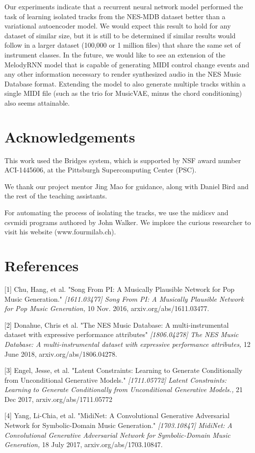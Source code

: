 \documentclass{article}
\begin{document}
Our experiments indicate that a recurrent neural network model performed the task of learning isolated tracks from the NES-MDB dataset better than a variational autoencoder model. We would expect this result to hold for any dataset of similar size, but it is still to be determined if similar results would follow in a larger dataset (100,000 or 1 million files) that share the same set of instrument classes. In the future, we would like to see an extension of the MelodyRNN model that is capable of generating MIDI control change events and any other information necessary to render synthesized audio in the NES Music Database format. Extending the model to also generate multiple tracks within a single MIDI file (such as the trio for MusicVAE, minus the chord conditioning) also seems attainable.

\section{Acknowledgements}
This work used the Bridges system, which is supported by NSF award number ACI-1445606, at the Pittsburgh Supercomputing Center (PSC).

We thank our project mentor Jing Mao for guidance, along with Daniel Bird and the rest of the teaching assistants.

For automating the process of isolating the tracks, we use the midicsv and csvmidi programs authored by John Walker. We implore the curious researcher to visit his website (www.fourmilab.ch).

\section*{References}

\small

[1] Chu, Hang, et al. "Song From PI: A Musically Plausible Network for Pop Music Generation." {\it [1611.03477] Song From PI: A Musically Plausible Network for Pop Music Generation,} 10 Nov. 2016, arxiv.org/abs/1611.03477.

[2] Donahue, Chris et al. "The NES Music Database: A multi-instrumental dataset with expressive performance attributes" {\it [1806.04278] The NES Music Database: A multi-instrumental dataset with expressive performance attributes,} 12 June 2018, arxiv.org/abs/1806.04278.

[3] Engel, Jesse, et al. "Latent Constraints: Learning to Generate Conditionally from Unconditional Generative Models." {\it[1711.05772] Latent Constraints: Learning to Generate Conditionally from Unconditional Generative Models.,} 21 Dec 2017, arxiv.org/abs/1711.05772

[4] Yang, Li-Chia, et al. "MidiNet: A Convolutional Generative Adversarial Network for Symbolic-Domain Music Generation." {\it[1703.10847] MidiNet: A Convolutional Generative Adversarial Network for Symbolic-Domain Music Generation,} 18 July 2017, arxiv.org/abs/1703.10847.
\end{document}
